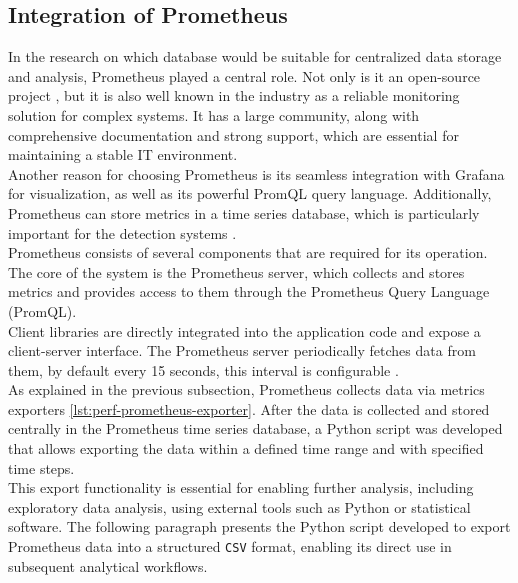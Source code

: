 \subsection{Integration of Prometheus}  
In the research on which database would be suitable for centralized data storage and analysis, Prometheus played a central role. Not only is it an open-source project \cite{prometheus_wiki}, but it is also well known in the industry as a reliable monitoring solution for complex systems. It has a large community, along with comprehensive documentation and strong support, which are essential for maintaining a stable IT environment.\\
Another reason for choosing Prometheus is its seamless integration with Grafana for visualization, as well as its powerful PromQL query language. Additionally, Prometheus can store metrics in a time series database, which is particularly important for the detection systems \cite{prom_advantages}.\\

Prometheus consists of several components that are required for its operation. The core of the system is the Prometheus server, which collects and stores metrics and provides access to them through the Prometheus Query Language (PromQL).\\
Client libraries are directly integrated into the application code and expose a client-server interface. The Prometheus server periodically fetches data from them, by default every 15 seconds, this interval is configurable \cite{Prometheus_how_it_works}.\\

As explained in the previous subsection, Prometheus collects data via metrics exporters \ref{lst:perf-prometheus-exporter}. After the data is collected and stored centrally in the Prometheus time series database, a Python script was developed that allows exporting the data within a defined time range and with specified time steps.\\
This export functionality is essential for enabling further analysis, including exploratory data analysis, using external tools such as Python or statistical software. The following paragraph presents the Python script developed to export Prometheus data into a structured \texttt{CSV} format, enabling its direct use in subsequent analytical workflows.\\

